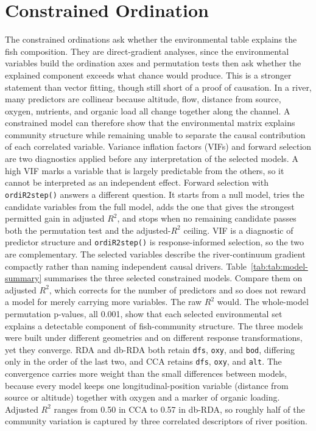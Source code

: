 \documentclass[11pt]{article}
\begin{document}
\section{Constrained Ordination}
The constrained ordinations ask whether the environmental table explains the fish composition. They are direct-gradient analyses, since the environmental variables build the ordination axes and permutation tests then ask whether the explained component exceeds what chance would produce. This is a stronger statement than vector fitting, though still short of a proof of causation. In a river, many predictors are collinear because altitude, flow, distance from source, oxygen, nutrients, and organic load all change together along the channel. A constrained model can therefore show that the environmental matrix explains community structure while remaining unable to separate the causal contribution of each correlated variable.
Variance inflation factors (VIFs) and forward selection are two diagnostics applied before any interpretation of the selected models. A high VIF marks a variable that is largely predictable from the others, so it cannot be interpreted as an independent effect. Forward selection with \texttt{ordiR2step()} answers a different question. It starts from a null model, tries the candidate variables from the full model, adds the one that gives the strongest permitted gain in adjusted $R^2$, and stops when no remaining candidate passes both the permutation test and the adjusted-$R^2$ ceiling. VIF is a diagnostic of predictor structure and \texttt{ordiR2step()} is response-informed selection, so the two are complementary. The selected variables describe the river-continuum gradient compactly rather than naming independent causal drivers.
Table~\ref{tab:tab:model-summary} summarises the three selected constrained models. Compare them on adjusted $R^2$, which corrects for the number of predictors and so does not reward a model for merely carrying more variables. The raw $R^2$ would. The whole-model permutation p-values, all 0.001, show that each selected environmental set explains a detectable component of fish-community structure. The three models were built under different geometries and on different response transformations, yet they converge. RDA and db-RDA both retain \texttt{dfs}, \texttt{oxy}, and \texttt{bod}, differing only in the order of the last two, and CCA retains \texttt{dfs}, \texttt{oxy}, and \texttt{alt}. The convergence carries more weight than the small differences between models, because every model keeps one longitudinal-position variable (distance from source or altitude) together with oxygen and a marker of organic loading. Adjusted $R^2$ ranges from 0.50 in CCA to 0.57 in db-RDA, so roughly half of the community variation is captured by three correlated descriptors of river position.
\end{document}

